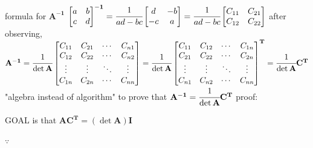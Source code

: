 \documentclass[12pt, a4paper]{article}
\begin{document}
{\noindent formula for ${\mathbf{A^{-1}}}$
\vspace{14pt}
\newline
\begin{math}
	\begin{bmatrix}
		a & b \\
		c & d 
	\end{bmatrix}^{\mathbf{-1}}
	 = 
	\cfrac{1}{ad-bc}
	\begin{bmatrix}
		d & -b \\
		-c & a 
	\end{bmatrix}
	 = 
	\cfrac{1}{ad-bc}
	\begin{bmatrix}
		C_{11} & C_{21} \\
		C_{12} & C_{22} 
	\end{bmatrix}
\end{math}
\vspace{14pt}
\newline
after observing, 
\begin{math}
	{\mathbf{A^{-1}}} = 
	\cfrac{1}{\det{\mathbf{A}}}
	\begin{bmatrix}
		C_{11} & C_{21} & \cdots & C_{n1} \\
		C_{12} & C_{22} & \cdots & C_{n2} \\
		\vdots & \vdots & \ddots & \vdots \\
		C_{1n} & C_{2n} & \cdots & C_{nn} 
	\end{bmatrix}
	 = 
	\cfrac{1}{\det{\mathbf{A}}}
	\begin{bmatrix}
		C_{11} & C_{12} & \cdots & C_{1n} \\
		C_{21} & C_{22} & \cdots & C_{2n} \\
		\vdots & \vdots & \ddots & \vdots \\
		C_{n1} & C_{n2} & \cdots & C_{nn} 
	\end{bmatrix}^{\mathbf{T}}
	 = 
	\cfrac{1}{\det{\mathbf{A}}}{\mathbf{C^{T}}}
\end{math}
\vspace{14pt}
\newline
"algebra instead of algorithm"
\vspace{14pt}
\newline
to prove that {\textcolor{anhao-scarlet}{${\mathbf{A^{-1}}} = \cfrac{1}{\det{\mathbf{A}}}{\mathbf{C^{T}}}$}}
\newline
proof:
\par GOAL is that ${\mathbf{A}}{\mathbf{C^{T}}} = \left( {\det{\mathbf{A}}} \right){\mathbf{I}}$
\par $\because$ 
\begin{math}

\end{math}}
\end{document}
